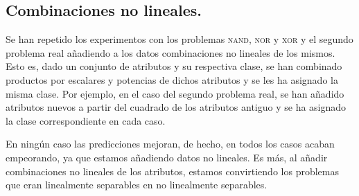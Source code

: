 \documentclass[spanish]{assignment}
\begin{document}
	\subsection{Combinaciones no lineales.}
	Se han repetido los experimentos con los problemas \textsc{nand}, \textsc{nor} y \textsc{xor} y el segundo problema real añadiendo a los datos combinaciones no lineales de los mismos. Esto es, dado un conjunto de atributos y su respectiva clase, se han combinado productos por escalares y potencias de dichos atributos y se les ha asignado la misma clase. Por ejemplo, en el caso del segundo problema real, se han añadido atributos nuevos a partir del cuadrado de los atributos antiguo y se ha asignado la clase correspondiente en cada caso.
	
	En ningún caso las predicciones mejoran, de hecho, en todos los casos acaban empeorando, ya que estamos añadiendo datos no lineales. Es más, al añadir combinaciones no lineales de los atributos, estamos convirtiendo los problemas que eran linealmente separables en no linealmente separables. 
\end{document}
